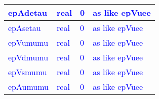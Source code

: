 \documentclass{article}
\begin{document}
\begin{longtable}{llll}
\midrule
\textcolor{blue}{epAdetau} & \begin{minipage}[t]{2cm}\textcolor{blue}{real}\end{minipage} & \begin{minipage}[t]{2cm}\textcolor{blue}{0}\end{minipage} & \begin{minipage}[t]{12cm}\textcolor{blue}{as like epVuee}\end{minipage}\\*
\midrule
\textcolor{blue}{epAsetau} & \begin{minipage}[t]{2cm}\textcolor{blue}{real}\end{minipage} & \begin{minipage}[t]{2cm}\textcolor{blue}{0}\end{minipage} & \begin{minipage}[t]{12cm}\textcolor{blue}{as like epVuee}\end{minipage}\\*
\midrule
\textcolor{blue}{epVumumu} & \begin{minipage}[t]{2cm}\textcolor{blue}{real}\end{minipage} & \begin{minipage}[t]{2cm}\textcolor{blue}{0}\end{minipage} & \begin{minipage}[t]{12cm}\textcolor{blue}{as like epVuee}\end{minipage}\\*
\midrule
\textcolor{blue}{epVdmumu} & \begin{minipage}[t]{2cm}\textcolor{blue}{real}\end{minipage} & \begin{minipage}[t]{2cm}\textcolor{blue}{0}\end{minipage} & \begin{minipage}[t]{12cm}\textcolor{blue}{as like epVuee}\end{minipage}\\*
\midrule
\textcolor{blue}{epVsmumu} & \begin{minipage}[t]{2cm}\textcolor{blue}{real}\end{minipage} & \begin{minipage}[t]{2cm}\textcolor{blue}{0}\end{minipage} & \begin{minipage}[t]{12cm}\textcolor{blue}{as like epVuee}\end{minipage}\\*
\midrule
\textcolor{blue}{epAumumu} & \begin{minipage}[t]{2cm}\textcolor{blue}{real}\end{minipage} & \begin{minipage}[t]{2cm}\textcolor{blue}{0}\end{minipage} & \begin{minipage}[t]{12cm}\textcolor{blue}{as like epVuee}\end{minipage}\\*

\end{longtable}
\end{document}

